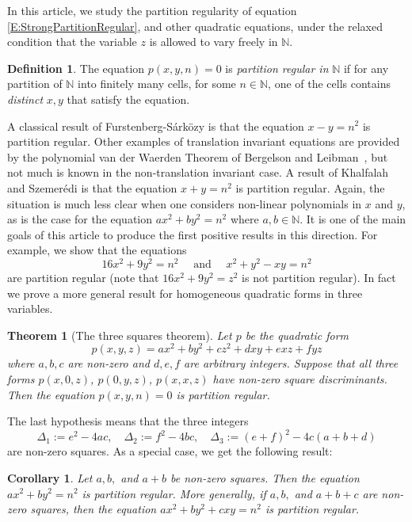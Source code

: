 \documentclass[11pt]{amsart}
\newtheorem{theorem}[lemma]{Theorem}
\newtheorem{corollary}[lemma]{Corollary}
\theoremstyle{definition}
\newtheorem*{definition}{Definition}
\begin{document}
In this article, we  study the  partition regularity of equation
\eqref{E:StrongPartitionRegular}, and other quadratic equations,
under the relaxed condition that the  variable $z$ is allowed to
vary freely in ${{\mathbb N}}$.
\begin{definition}
The equation $p(x,y,n)=0$ is \emph{partition
regular in} ${{\mathbb N}}$ if for any partition of ${{\mathbb N}}$
into finitely many cells, for some $n\in {{\mathbb N}}$,
one of the cells  contains \emph{distinct} $x,y$ that satisfy the equation.
\end{definition}
A classical result of Furstenberg-S\'ark\"ozy  \cite{Fu77, Sa78}  is
that the equation $x-y=n^2$ is partition regular.
 Other examples of translation invariant equations are provided by the polynomial van der Waerden Theorem
 of Bergelson and Leibman~\cite{BL96},
 but not much is known in the non-translation invariant case.
A result of Khalfalah and Szemer\'edi \cite{KS06}  is that the
equation $x+y=n^2$ is partition regular.
Again, the
situation is much less clear when one considers non-linear
polynomials in $x$ and $y$, as is the case for the equation
 $a x^2+by^2=n^2$ where $a,b\in {{\mathbb N}}$.
It is one of the main goals of this article to produce the first
positive results in this direction. For example, we   show that the
equations
$$
16x^2+9y^2=n^2    \quad \text{ and } \quad x^2+y^2- xy=n^2
$$
are partition regular (note that $16x^2+9y^2=z^2$ is not partition
regular).
In fact we prove a  more general result for  homogeneous quadratic
forms in three variables.
\begin{theorem}[The three squares theorem]\label{th:partition-regular1}
Let $p$ be the quadratic form
\begin{equation}
\label{E:Q2} p(x,y,z)=ax^2+by^2+cz^2+dxy+exz+fyz
\end{equation}
where  $a, b, c$ are non-zero  and $d,e,f$ are arbitrary integers.
Suppose that all three forms $p(x,0,z)$, $p(0,y,z)$, $p(x,x,z)$ have
non-zero square discriminants. Then the equation $ p(x,y,n)=0 $ is
partition regular.
\end{theorem}
The last hypothesis means that
the three integers
$$
\Delta_1:=e^2-4ac,  \quad \Delta_2:=f^2-4bc,  \quad \Delta_3:=(e+f)^2-4c(a+b+d)
$$
are non-zero squares.
As a special case, 
 we get the following result:
\begin{corollary}\label{Corol1}
Let  $a,b,$ and $a+b$ be non-zero squares. Then the equation $
ax^2+by^2=n^2 $ is partition regular. More generally, if   $a,b,$
and $a+b+c$ are  non-zero squares, then the equation $
ax^2+by^2+cxy=n^2 $ is partition regular.
\end{corollary}
\end{document}
